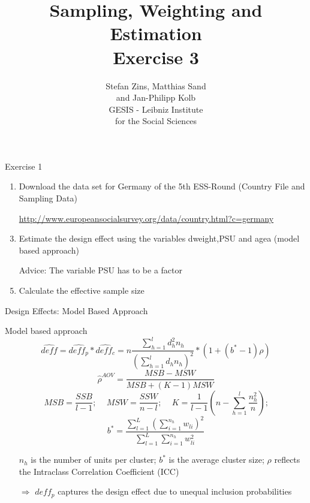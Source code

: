 \documentclass[11pt,german,hideothersubsections]{beamer}\usepackage[]{graphicx}\usepackage[]{color}
\title[Day 3]{Sampling, Weighting and Estimation\\ \Large{Exercise 3} }
\author[M. Sand]{Stefan Zins, Matthias Sand\\ and Jan-Philipp Kolb\\ \vspace{.5cm} \footnotesize{GESIS - Leibniz Institute\\ for the Social Sciences}}
\begin{document}
\maketitle



\begin{frame}[fragile]{Exercise 1}

\begin{enumerate}

\item Download the data set for Germany of the 5th ESS-Round (Country File and Sampling Data)
\item[] \url{http://www.europeansocialsurvey.org/data/country.html?c=germany}
\item Estimate the design effect using the variables \alert{dweight},\alert{PSU} and \alert{agea} (model based approach) 
\item[] \alert{Advice:} The variable \alert{PSU} has to be a factor
\item Calculate the effective sample size
 

\end{enumerate}


\end{frame}
\begin{frame}[fragile]{Design Effects: Model Based Approach}
\footnotesize{
\begin{block}{Model based approach}
\begin{equation*}
\hat{deff}=\hat{deff_p} * \hat{deff_c} = n\frac{\sum_{h=1}^ld_h^2 n_h}{(\sum_{h=1}^ld_h n_h)^2}*(1+(b^{*}-1)\rho)
\end{equation*}
\begin{equation*}
\hat{\rho}^{AOV}=\frac{MSB-MSW}{MSB+(K-1)MSW}
\end{equation*}
\begin{equation*}
MSB=\frac{SSB}{l-1}\text{;~~~~}MSW=\frac{SSW}{n-l}\text{;~~~~}K=\frac{1}{l-1}(n-\sum_{h=1}^l\frac{n_h^2}{n})\text{;}
\end{equation*}
\begin{equation*}
b^{*}=\frac{\sum_{l=1}^{L}(\sum_{i=1}^{n_h}w_{li})^2}{\sum_{l=1}^{L}\sum_{i=1}^{n_h}w_{li}^2}
\end{equation*}
\end{block}

\begin{itemize}
\item[] \alert{$n_h$} is the number of units per cluster; \alert{$b^{*}$} is the average cluster size; \alert{$\rho$} reflects the Intraclass Correlation Coefficient (ICC)
\item[$\Rightarrow$] $deff_p$ captures the design effect due to unequal inclusion probabilities
\end{itemize}
}
\end{frame}
\end{document}
